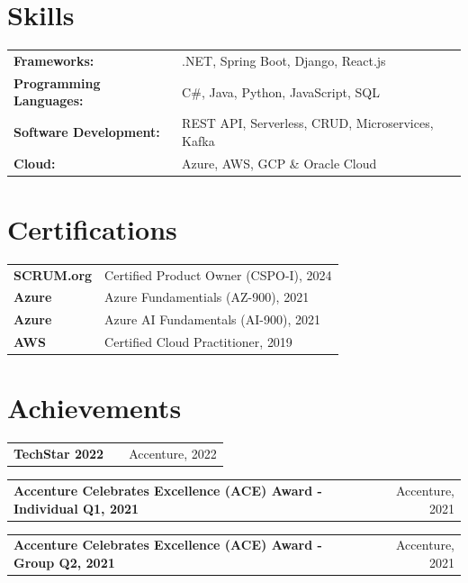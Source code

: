 \documentclass[a4paper,12pt]{article}
\makeatletter
\newenvironment{jobshort}[2]
    {
    \begin{tabularx}{\linewidth}{@{}l X r@{}}
    \textbf{#1} & \hfill &  #2 \\[2.75pt]
    \end{tabularx}
    }
    {
    }
\makeatother
\begin{document}
\section{Skills}
\begin{tabularx}{\linewidth}{@{}l X@{}}
\textbf{Frameworks:} & \hfill \normalsize{.NET, Spring Boot, Django, React.js}\\
\textbf{Programming Languages:} & \hfill \normalsize{C\#, Java, Python, JavaScript, SQL}\\
\textbf{Software Development:} & \hfill \normalsize{REST API, Serverless, CRUD, Microservices, Kafka}\\
\textbf{Cloud:} & \hfill \normalsize{Azure, AWS, GCP \& Oracle Cloud}\\
\end{tabularx}


\section{Certifications}
\begin{tabularx}{\linewidth}{@{}l X@{}}
\textbf{SCRUM.org} & \hfill \normalsize{Certified Product Owner (CSPO-I), 2024}\\
\textbf{Azure} & \hfill \normalsize{Azure Fundamentials (AZ-900), 2021}\\
\textbf{Azure} & \hfill \normalsize{Azure AI Fundamentals (AI-900), 2021}\\
\textbf{AWS} & \hfill \normalsize{Certified Cloud Practitioner, 2019}\\
\end{tabularx}

\section{Achievements}
\begin{jobshort}{TechStar 2022} {Accenture, 2022}\end{jobshort}
\begin{jobshort}{Accenture Celebrates Excellence (ACE) Award - Individual Q1, 2021} {Accenture, 2021}\end{jobshort}
\begin{jobshort}{Accenture Celebrates Excellence (ACE) Award - Group Q2, 2021} {Accenture, 2021}\end{jobshort}
\end{document}
